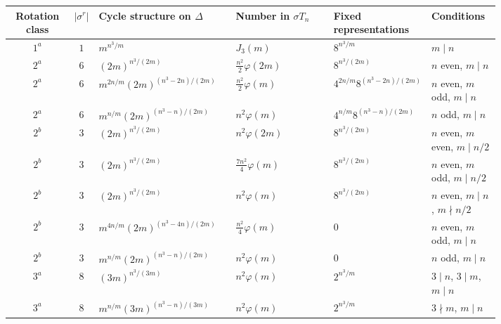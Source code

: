 \documentclass[12pt]{article}
\theoremstyle{definition}
\theoremstyle{remark}
\begin{document}
\begin{table}
\centering
\small
\setlength{\tabcolsep}{3.5pt}
\renewcommand{\arraystretch}{1.25}
\begin{tabular}{c c p{0.29\linewidth} p{0.20\linewidth} p{0.18\linewidth} p{0.14\linewidth}}
\toprule
Rotation class
& $\vert \sigma^r\vert $
& Cycle structure on $\Delta$
& Number in $\sigma T_n$
& Fixed representations
& Conditions \\
\midrule

$1^a$
& $1$
& $m^{n^3/m}$
& $J_3(m)$
& $8^{n^3/m}$
& $m\mid n$ \\

\midrule

$2^a$
& $6$
& $(2m)^{n^3/(2m)}$
& $\frac{n^2}{2}\varphi(2m)$
& $8^{n^3/(2m)}$
& $n$ even, $m\mid n$ \\

$2^a$
& $6$
& $m^{2n/m}(2m)^{(n^3-2n)/(2m)}$
& $\frac{n^2}{2}\varphi(m)$
& $4^{2n/m}8^{(n^3-2n)/(2m)}$
& $n$ even, $m$ odd, $m\mid n$ \\

$2^a$
& $6$
& $m^{n/m}(2m)^{(n^3-n)/(2m)}$
& $n^2\varphi(m)$
& $4^{n/m}8^{(n^3-n)/(2m)}$
& $n$ odd, $m\mid n$ \\

\midrule

$2^b$
& $3$
& $(2m)^{n^3/(2m)}$
& $n^2\varphi(2m)$
& $8^{n^3/(2m)}$
& $n$ even, $m$ even, $m\mid n/2$ \\

$2^b$
& $3$
& $(2m)^{n^3/(2m)}$
& $\frac{7n^2}{4}\varphi(m)$
& $8^{n^3/(2m)}$
& $n$ even, $m$ odd, $m\mid n/2$ \\

$2^b$
& $3$
& $(2m)^{n^3/(2m)}$
& $n^2\varphi(m)$
& $8^{n^3/(2m)}$
& $n$ even, $m\mid n$, $m\nmid n/2$ \\

$2^b$
& $3$
& $m^{4n/m}(2m)^{(n^3-4n)/(2m)}$
& $\frac{n^2}{4}\varphi(m)$
& $0$
& $n$ even, $m$ odd, $m\mid n$ \\

$2^b$
& $3$
& $m^{n/m}(2m)^{(n^3-n)/(2m)}$
& $n^2\varphi(m)$
& $0$
& $n$ odd, $m\mid n$ \\

\midrule

$3^a$
& $8$
& $(3m)^{n^3/(3m)}$
& $n^2\varphi(m)$
& $2^{n^3/m}$
& $3\mid n$, $3\mid m$, $m\mid n$ \\

$3^a$
& $8$
& $m^{n/m}(3m)^{(n^3-n)/(3m)}$
& $n^2\varphi(m)$
& $2^{n^3/m}$
& $3\nmid m$, $m\mid n$ \\


\end{tabular}
\end{table}
\end{document}
